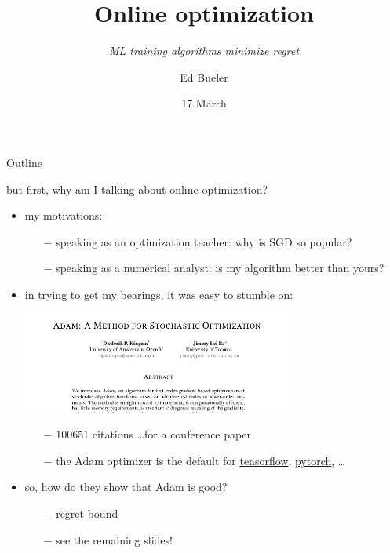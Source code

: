 \documentclass[xcolor={svgnames},
               hyperref={colorlinks,citecolor=DeepPink4,linkcolor=FireBrick,urlcolor=Maroon}]
               {beamer}
\title{Online optimization}
\subtitle{\emph{ML training algorithms minimize regret}}
\author{Ed Bueler}
\institute[UAF]{MATH 692 Mathematics for Machine Learning}
\date[Spring 2022]{17 March}
\begin{document}
\beamertemplatenavigationsymbolsempty

\begin{frame}
  \maketitle
\end{frame}


\begin{frame}{Outline}
  \tableofcontents[hideallsubsections]
\end{frame}


\begin{frame}{but first, why am I talking about online optimization?}

\begin{itemize}
\item my motivations:
    \begin{itemize}
    \item[$-$] speaking as an optimization teacher: why is SGD so popular?
    \item[$-$] speaking as a numerical analyst: is my algorithm better than yours?
    \end{itemize}

\medskip
\item in trying to get my bearings, it was easy to stumble on:

\begin{center}
\includegraphics[width=0.7\textwidth]{figs/adam-paper.png}
\end{center}

\medskip
    \begin{itemize}
    \item[$-$] 100651 citations \dots for a conference paper
    \item[$-$] the Adam optimizer is the default for \href{https://www.tensorflow.org/tutorials/keras/classification}{tensorflow}, \href{https://pytorch.org/docs/stable/optim.html}{pytorch}, \dots
    \end{itemize}

\medskip
\item so, how do they show that Adam is good?
    \begin{itemize}
    \item[$-$] regret bound
    \item[$-$] see the remaining slides!
    \end{itemize}
\end{itemize}
\end{frame}
\end{document}
